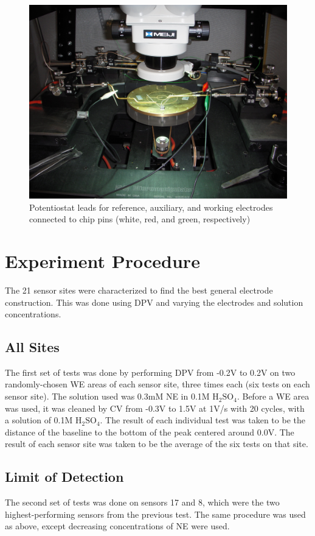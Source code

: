 \begin{figure}
	\centering
	\includegraphics[width=0.5\linewidth]{figures/potentiostatleads.png}
	\caption[Potentiostat leads connected to pins]{Potentiostat leads for reference, auxiliary, and working electrodes connected to chip pins (white, red, and green, respectively)}
	\label{potentiostatleads}
\end{figure}

\section{Experiment Procedure}

The 21 sensor sites were characterized to find the best general electrode construction. This was done using DPV and varying the electrodes and solution concentrations.

\subsection{All Sites}

The first set of tests was done by performing DPV from -0.2V to 0.2V on two randomly-chosen WE areas of each sensor site, three times each (six tests on each sensor site). The solution used was 0.3mM NE in 0.1M $\mathrm{H}_2\mathrm{SO}_4$. Before a WE area was used, it was cleaned by CV from -0.3V to 1.5V at 1V/s with 20 cycles, with a solution of 0.1M $\mathrm{H}_2\mathrm{SO}_4$. The result of each individual test was taken to be the distance of the baseline to the bottom of the peak centered around 0.0V. The result of each sensor site was taken to be the average of the six tests on that site.

\subsection{Limit of Detection}

The second set of tests was done on sensors 17 and 8, which were the two highest-performing sensors from the previous test. The same procedure was used as above, except decreasing concentrations of NE were used.

